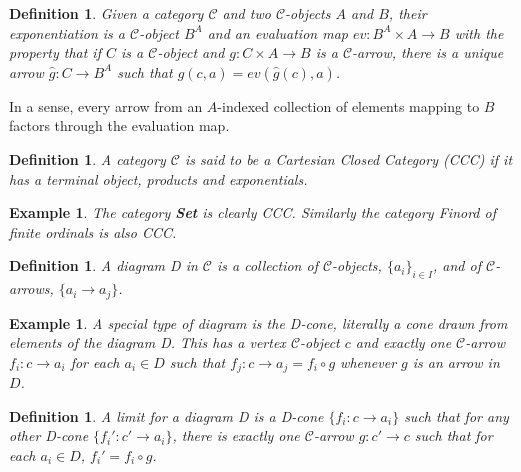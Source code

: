 \documentclass[12pt,a4paper]{article}
\newtheorem{example}[theorem]{Example}
\newtheorem{definition}[theorem]{Definition}
\newcommand\CC{\mathcal{C}}
\begin{document}
\begin{definition}
    Given a category $\CC$ and two $\CC$-objects $A$ and $B$, their \textit{exponentiation} is a $\CC$-object $B^A$ and an \textit{evaluation map} $ev:B^A\times A\to B$ with the property that if $C$ is a $\CC$-object and $g:C\times A\to B$ is a $\CC$-arrow, there is a unique arrow $\hat{g}:C\to B^A$ such that $g(c,a)=ev(\hat{g}(c),a)$.\\
    \begin{center}
    \end{center}
\end{definition}
In a sense, every arrow from an $A$-indexed collection of elements mapping to $B$ factors through the evaluation map.

\begin{definition}
    A category $\CC$ is said to be a Cartesian Closed Category (CCC) if it has a terminal object, products and exponentials.
\end{definition}

\begin{example}
    The category \textbf{Set} is clearly CCC. Similarly the category \textit{Finord} of finite ordinals is also CCC.
\end{example}

\begin{definition}
    A \textit{diagram} D in $\CC$ is a collection of $\CC$-objects, $\{a_i\}_{i\in I}$, and of $\CC$-arrows, $\{a_i\to a_j\}$.
\end{definition}

\begin{example}
    A special type of diagram is the D-cone, literally a cone drawn from elements of the diagram D.
    This has a vertex $\CC$-object $c$ and exactly one $\CC$-arrow $f_i:c\to a_i$ for each $a_i\in D$ such that $f_j:c\to a_j=f_i\circ g$ whenever $g$ is an arrow in $D$.
\end{example}

\begin{definition}
    A \textit{limit} for a diagram D is a D-cone $\{f_i:c\to a_i\}$ such that for any other D-cone $\{f_i':c'\to a_i\}$, there is exactly one $\CC$-arrow $g:c'\to c$ such that for each $a_i\in D$, $f_i'=f_i\circ g$.
    \begin{center}
    \end{center}
\end{definition}
\end{document}
